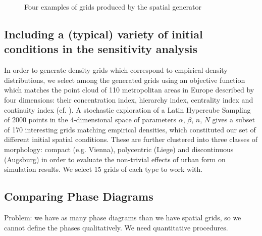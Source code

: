 \documentclass[Afour,sageh,times]{sagej}
\begin{document}
\begin{figure}[htbp] \begin{center} 
 \caption{Four examples of grids produced by the spatial generator} \label{fig:spatialGen} \end{center} \end{figure} %


\subsection{Including a (typical) variety of initial conditions in the sensitivity analysis}

In order to generate density grids which correspond to empirical density distributions, we select among the generated grids using an objective function which matches the point cloud of 110 metropolitan areas in Europe described by four dimensions: their concentration index, hierarchy index, centrality index and continuity index (cf. \cite{LeNechet2015}). A stochastic exploration of a Latin Hypercube Sampling of 2000 points in the 4-dimensional space of parameters {$\alpha$, $\beta$, $n$, $N$} gives a subset of 170 interesting grids matching empirical densities, which constituted our set of different initial spatial conditions. These are further clustered into three classes of morphology: compact (e.g. Vienna), polycentric (Liege) and discontinuous (Augsburg) in order to evaluate the non-trivial effects of urban form on simulation results. We select 15 grids of each type to work with.



\subsection{Comparing Phase Diagrams}

Problem: we have as many phase diagrams than we have spatial grids, so we cannot define the phases qualitatively. We need quantitative procedures.
\end{document}
